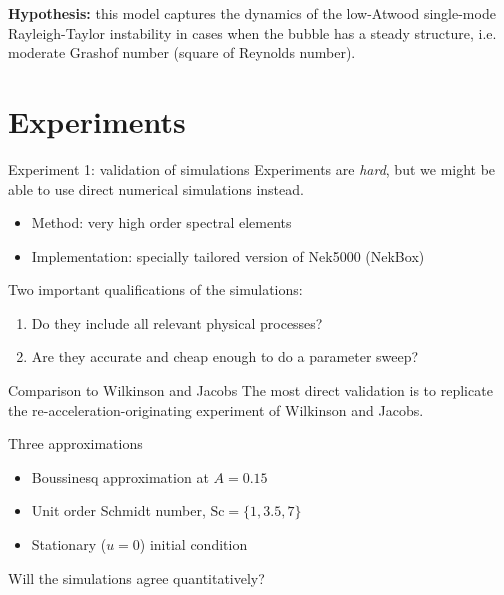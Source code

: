 \documentclass[12pt]{beamer}
\begin{document}
\begin{frame}
\textbf{Hypothesis:} this model captures the dynamics of the low-Atwood single-mode Rayleigh-Taylor instability in cases when the bubble has a steady structure, i.e. moderate Grashof number (square of Reynolds number).
\end{frame}

\section{Experiments}

\begin{frame}{Experiment 1: validation of simulations}
Experiments are \textit{hard}, but we might be able to use direct numerical simulations
 instead.
\begin{itemize}
  \item Method: very high order spectral elements
  \item Implementation: specially tailored version of Nek5000 (NekBox)
\end{itemize}
\vspace{20pt}\pause

Two important qualifications of the simulations:
\begin{enumerate}
  \item Do they include all relevant physical processes?
  \item Are they accurate and cheap enough to do a parameter sweep?
\end{enumerate}
\end{frame}

\begin{frame}{Comparison to Wilkinson and Jacobs}
The most direct validation is to replicate the re-acceleration-originating experiment of Wilkinson and Jacobs.

\begin{block}{Three approximations}
\begin{itemize}
  \item Boussinesq approximation at $A = 0.15$
  \item Unit order Schmidt number, $\text{Sc} = \{1,3.5,7\}$
  \item Stationary ($u = 0$) initial condition
\end{itemize}
\end{block}

\begin{exampleblock}{}
Will the simulations agree quantitatively?
\end{exampleblock}
\end{frame}
\end{document}
